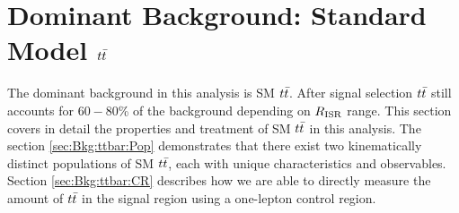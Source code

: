 \section{Dominant Background: Standard Model $t\bar{t}$}
\label{sec:Bkg:ttbar}

\indent The dominant background in this analysis is SM $t\bar{t}$.  After signal selection $t\bar{t}$ still accounts for $60-80$\% of the background depending on $R_{\mathrm{ISR}}$ range.  This section covers in detail the properties and treatment of SM $t\bar{t}$ in this analysis.  The section \ref{sec:Bkg:ttbar:Pop} demonstrates that there exist two kinematically distinct populations of SM $t\bar{t}$, each with unique characteristics and observables.  Section \ref{sec:Bkg:ttbar:CR} describes how we are able to directly measure the amount of $t\bar{t}$ in the signal region using a one-lepton control region.  \\





